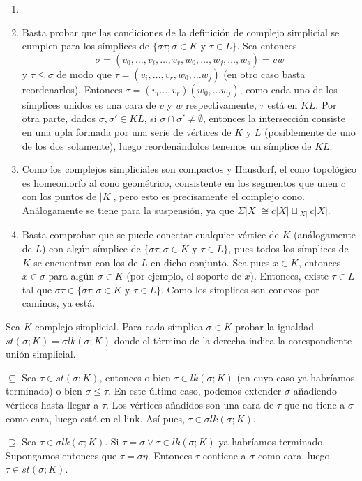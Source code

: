 \documentclass[twoside]{article}
\begin{document}
\begin{solucion}
\begin{enumerate}
\item[]
\item Basta probar que las condiciones de la definición de complejo simplicial se cumplen para los símplices de $\{στ; σ \in K \text{ y }τ \in L\}$. Sea entonces $$\sigma=(v_0,\dots,v_i,\dots, v_r, w_0,\dots,w_j,\dots, w_s)=vw$$ y $\tau\leq\sigma$ de modo que $\tau=(v_i,\dots, v_r,w_0,\dots w_j)$ (en otro caso basta reordenarlos). Entonces $\tau=(v_i\dots, v_r)(w_0,\dots w_j)$, como cada uno de los símplices unidos es una cara de $v$ y $w$ respectivamente, $\tau$ está en $KL$. Por otra parte, dados $\sigma,\sigma'\in KL$, si $\sigma\cap\sigma'\neq\emptyset$, entonces la intersección consiste en una upla formada por una serie de vértices de $K$ y $L$ (posiblemente de uno de los dos solamente), luego reordenándolos tenemos un símplice de $KL$.

\item Como los complejos simpliciales son compactos y Hausdorf, el cono topológico es homeomorfo al cono geométrico, consistente en los segmentos que unen $c$ con los puntos de $|K|$, pero esto es precisamente el complejo cono. Análogamente se tiene para la suspensión, ya que $\Sigma |X|\cong c|X|\sqcup_{|X|} c|X|$.

\item Basta comprobar que se puede conectar cualquier vértice de $K$ (análogamente de $L$) con algún símplice de $\{στ; σ \in K \text{ y }τ \in L\}$, pues todos los símplices de $K$ se encuentran con los de $L$ en dicho conjunto. Sea pues $x\in K$, entonces $x\in\sigma$ para algún $\sigma\in K$ (por ejemplo, el soporte de $x$). Entonces, existe $\tau\in L$ tal que $\sigma\tau\in\{στ; σ \in K \text{ y }τ \in L\}$. Como los símplices son conexos por caminos, ya está. 

\end{enumerate}
\end{solucion}

\newpage

\begin{ejercicio}{1.3}
Sea $K$ complejo simplicial.
Para cada símplica $σ \in K$ probar la igualdad $st(σ;K) = σlk(σ;K)$ donde el término de la derecha indica la corespondiente unión simplicial.
\end{ejercicio}
\begin{solucion}
$\boxed{\subseteq}$ Sea $\tau\in st(σ;K)$, entonces o bien $\tau\in lk(σ;K)$ (en cuyo caso ya habríamos terminado) o bien $\sigma\leq\tau$. En este último caso, podemos extender $\sigma$ añadiendo vértices hasta llegar a $\tau$. Los vértices añadidos son una cara de $\tau$ que no tiene a $\sigma$ como cara, luego está en el link. Así pues, $\tau\in σlk(σ;K)$. 

$\boxed{\supseteq}$ Sea $\tau\in σlk(σ;K)$. Si $\tau=\sigma\lor\tau\in lk(σ;K)$ ya habríamos terminado. Supongamos entonces que $\tau=\sigma\eta$. Entonces $\tau$ contiene a $\sigma$ como cara, luego $\tau\in st(σ;K)$.
\end{solucion}
\end{document}
